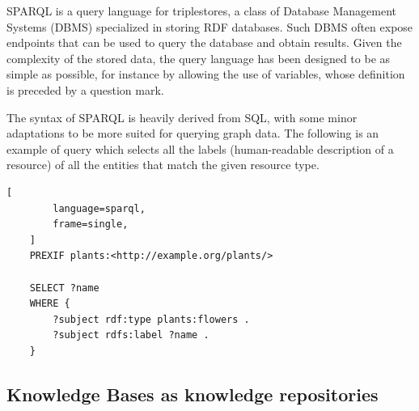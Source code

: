 \documentclass[%
    corpo=13.5pt,
    twoside,
    oldstyle,
    tipotesi=magistrale,
    greek,
    evenboxes
]{toptesi}
\begin{document}
SPARQL is a query language for triplestores, a class of Database
Management Systems (DBMS) specialized in storing RDF databases. Such DBMS
often expose endpoints that can be used to query the database and obtain
results. Given the complexity of the stored data, the query language has
been designed to be as simple as possible, for instance by allowing the use
of variables, whose definition is preceded by a question mark.

The syntax of SPARQL is heavily derived from SQL, with some
minor adaptations to be more suited for querying graph data. The
following is an example of query which selects all the labels
(human-readable description of a resource) of all the entities that
match the given resource type.

\begin{lstlisting}[
        language=sparql,
        frame=single,
    ]
    PREXIF plants:<http://example.org/plants/>

    SELECT ?name
    WHERE {
        ?subject rdf:type plants:flowers .
        ?subject rdfs:label ?name .
    }
\end{lstlisting}

\subsection{Knowledge Bases as knowledge repositories}
\end{document}
